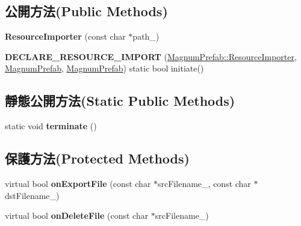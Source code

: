 \subsection*{公開方法(Public Methods)}
\begin{DoxyCompactItemize}
\item 
{\bfseries Resource\+Importer} (const char $\ast$path\+\_\+)\hypertarget{class_magnum_1_1_magnum_prefab_1_1_resource_importer_a5b2a0d6393e04a564b96d9c2f061c007}{}\label{class_magnum_1_1_magnum_prefab_1_1_resource_importer_a5b2a0d6393e04a564b96d9c2f061c007}

\item 
{\bfseries D\+E\+C\+L\+A\+R\+E\+\_\+\+R\+E\+S\+O\+U\+R\+C\+E\+\_\+\+I\+M\+P\+O\+RT} (\hyperlink{class_magnum_1_1_magnum_prefab_1_1_resource_importer}{Magnum\+Prefab\+::\+Resource\+Importer}, \hyperlink{class_magnum_1_1_magnum_prefab}{Magnum\+Prefab}, \hyperlink{class_magnum_1_1_magnum_prefab}{Magnum\+Prefab}) static bool initiate()\hypertarget{class_magnum_1_1_magnum_prefab_1_1_resource_importer_a19096565fea01b5b54c24b7259418344}{}\label{class_magnum_1_1_magnum_prefab_1_1_resource_importer_a19096565fea01b5b54c24b7259418344}

\end{DoxyCompactItemize}
\subsection*{靜態公開方法(Static Public Methods)}
\begin{DoxyCompactItemize}
\item 
static void {\bfseries terminate} ()\hypertarget{class_magnum_1_1_magnum_prefab_1_1_resource_importer_ab9dffc341c1cb8107ff67c76c30f7409}{}\label{class_magnum_1_1_magnum_prefab_1_1_resource_importer_ab9dffc341c1cb8107ff67c76c30f7409}

\end{DoxyCompactItemize}
\subsection*{保護方法(Protected Methods)}
\begin{DoxyCompactItemize}
\item 
virtual bool {\bfseries on\+Export\+File} (const char $\ast$src\+Filename\+\_\+, const char $\ast$dst\+Filename\+\_\+)\hypertarget{class_magnum_1_1_magnum_prefab_1_1_resource_importer_a101abc1a40806b08d4df8908d465371f}{}\label{class_magnum_1_1_magnum_prefab_1_1_resource_importer_a101abc1a40806b08d4df8908d465371f}

\item 
virtual bool {\bfseries on\+Delete\+File} (const char $\ast$src\+Filename\+\_\+)\hypertarget{class_magnum_1_1_magnum_prefab_1_1_resource_importer_a14ffda5abcb27a57d8d2a76f28017d88}{}\label{class_magnum_1_1_magnum_prefab_1_1_resource_importer_a14ffda5abcb27a57d8d2a76f28017d88}

\end{DoxyCompactItemize}
